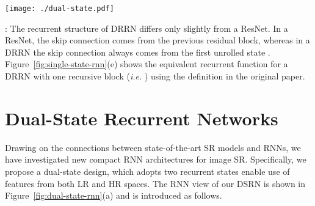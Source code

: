 \documentclass[10pt,twocolumn,letterpaper]{article}
\newcommand{\algname}{DSRN }
\newcommand{\algnamens}{DSRN}
\begin{document}
\begin{figure*}[t!]
\begin{centering}
\texttt{[image: ./dual-state.pdf]}
\par\end{centering}
\vspace*{0.05in}
\caption{(a) The recurrent representation of the proposed \algnamens, whose graph definition is the same as Figure \ref{fig:single-state-rnn}(a). (b) The unrolled \algnamens. Edges with the same color have identical state transition functions and shared parameters.  The structures of four specific transition functions have been illustrated correspondingly.  ``Conv'' blocks with different colors indicate different parameters. }
\label{fig:dual-state-rnn}
\end{figure*}


\vspace*{0.05in}
:  The recurrent structure of DRRN differs only slightly from a ResNet.  In a ResNet, the skip connection comes from the previous residual block, whereas in a DRRN the skip connection always comes from the first unrolled state . Figure~\ref{fig:single-state-rnn}(e) shows the equivalent recurrent function for a DRRN with one recursive block (\emph{i.e.} ) using the definition in the original paper.




































 
\section{Dual-State Recurrent Networks}
Drawing on the connections between state-of-the-art SR models and RNNs, we have investigated new compact RNN architectures for image SR.  Specifically, we propose a dual-state design, which adopts two recurrent states enable use of features from both LR and HR spaces.  The RNN view of our \algname is shown in Figure~\ref{fig:dual-state-rnn}(a) and is introduced as follows. 
\end{document}
